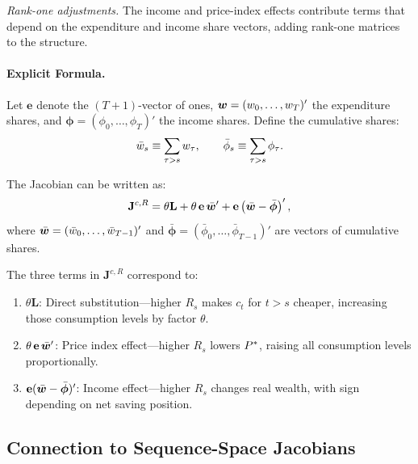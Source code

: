 \medskip
\noindent
\textit{Rank-one adjustments.} The income and price-index effects contribute terms that depend on the expenditure and income share vectors, adding rank-one matrices to the structure.

\paragraph{Explicit Formula.}
Let $\mathbf{e}$ denote the $(T+1)$-vector of ones, $\bm{w} = (w_0, \ldots, w_T)'$ the expenditure shares, and $\bm{\phi} = (\phi_0, \ldots, \phi_T)'$ the income shares. Define the cumulative shares:
\begin{equation}
\bar{w}_s \equiv \sum_{\tau > s} w_{\tau}, \qquad \bar{\phi}_s \equiv \sum_{\tau > s} \phi_{\tau}.
\label{eq:cumulative-shares}
\end{equation}

The Jacobian can be written as:
\begin{equation}
\mathbf{J}^{c,R} = \theta \mathbf{L} + \theta \, \mathbf{e} \, \bar{\bm{w}}' + \mathbf{e} \left( \bar{\bm{w}} - \bar{\bm{\phi}} \right)',
\label{eq:jacobian-formula}
\end{equation}
where $\bar{\bm{w}} = (\bar{w}_0, \ldots, \bar{w}_{T-1})'$ and $\bar{\bm{\phi}} = (\bar{\phi}_0, \ldots, \bar{\phi}_{T-1})'$ are vectors of cumulative shares.

\begin{calloutnote}
The three terms in $\mathbf{J}^{c,R}$ correspond to:
\begin{enumerate}[nosep]
\item $\theta \mathbf{L}$: Direct substitution---higher $R_s$ makes $c_t$ for $t > s$ cheaper, increasing those consumption levels by factor $\theta$.
\item $\theta \, \mathbf{e} \, \bar{\bm{w}}'$: Price index effect---higher $R_s$ lowers $P^{*}$, raising all consumption levels proportionally.
\item $\mathbf{e} (\bar{\bm{w}} - \bar{\bm{\phi}})'$: Income effect---higher $R_s$ changes real wealth, with sign depending on net saving position.
\end{enumerate}
\end{calloutnote}

\subsection{Connection to Sequence-Space Jacobians}
\label{subsec:sequence-space}

